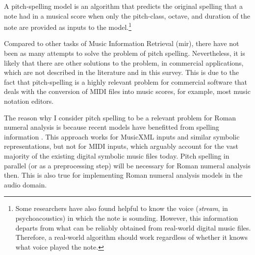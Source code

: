 

A pitch-spelling model is an algorithm that predicts the
original spelling that a note had in a musical score when
only the pitch-class, octave, and duration of the note are
provided as inputs to the model.\footnote{Some researchers
have also found helpful to know the voice (\emph{stream}, in
psychoacoustics) in which the note is sounding. However,
this information departs from what can be reliably obtained
from real-world digital music files. Therefore, a real-world
algorithm should work regardless of whether it knows what
voice played the note.}


Compared to other tasks of Music Information Retrieval
(\gls{mir}), there have not been as many attempts to solve the
problem of pitch spelling. Nevertheless, it is likely that
there are other solutions to the problem, in commercial
applications, which are not described in the literature and
in this survey. This is due to the fact that pitch-spelling
is a highly relevant problem for commercial software that
deals with the conversion of MIDI files into music scores,
for example, most music notation editors.

The reason why I consider pitch spelling to be a relevant problem for Roman numeral analysis is because recent models have benefitted from spelling information \parencite{micchi2020not}. This approach works for MusicXML inputs and similar symbolic representations, but not for MIDI inputs, which arguably account for the vast majority of the existing digital symbolic music files today. Pitch spelling in parallel (or as a preprocessing step) will be necessary for Roman numeral analysis then. This is also true for implementing Roman numeral analysis models in the audio domain.
